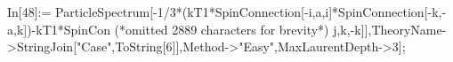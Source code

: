 In[48]:= ParticleSpectrum[-1/3*(kT1*SpinConnection[-i,a,i]*SpinConnection[-k,-a,k])-kT1*SpinCon (*omitted 2889 characters for brevity*) j,k,-k]],TheoryName->StringJoin["Case",ToString[6]],Method->"Easy",MaxLaurentDepth->3];